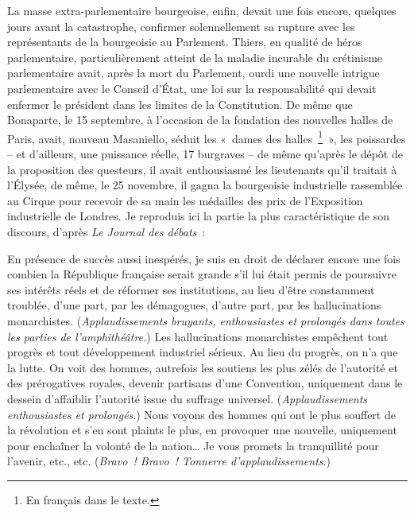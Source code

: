 \documentclass[french,twoside]{book} %
\newenvironment{quoteblock}%
  {\begin{quoting}}
  {\end{quoting}}
\newenvironment{quotebar}{%
    \def\FrameCommand{{\color{rubric!10!}\vrule width 0.5em} \hspace{0.9em}}%
    \def\OuterFrameSep{\itemsep} %
    \MakeFramed {\advance\hsize-\width \FrameRestore}
  }%
  {%
    \endMakeFramed
  }
\renewenvironment{quoteblock}%
  {%
    \savenotes
    \setstretch{0.9}
    \normalfont
    \begin{quotebar}
  }
  {%
    \end{quotebar}
    \spewnotes
  }
\begin{document}
La masse extra-parlementaire bourgeoise, enfin, devait une fois encore, quelques jours avant la catastrophe, confirmer solennellement sa rupture avec les représentants de la bourgeoisie au Parlement. Thiers, en qualité de héros parlementaire, particulièrement atteint de la maladie incurable du crétinisme parlementaire avait, après la mort du Parlement, ourdi une nouvelle intrigue parlementaire avec le Conseil d’État, une loi sur la responsabilité qui devait enfermer le président dans les limites de la Constitution. De même que Bonaparte, le 15 septembre, à l’occasion de la fondation des nouvelles halles de Paris, avait, nouveau Masaniello, séduit les « dames des halles \footnote{En français dans le texte.} », les poissardes – et d’ailleurs, une puissance réelle, 17 burgraves – de même qu’après le dépôt de la proposition des questeurs, il avait enthousiasmé les lieutenants qu’il traitait à l’Élysée, de même, le 25 novembre, il gagna la bourgeoisie industrielle rassemblée au Cirque pour recevoir de sa main les médailles des prix de l’Exposition industrielle de Londres. Je reproduis ici la partie la plus caractéristique de son discours, d’après \emph{Le Journal des débats} :\par

\begin{quoteblock}
 \noindent En présence de succès aussi inespérés, je suis en droit de déclarer encore une fois combien la République française serait grande s’il lui était permis de poursuivre ses intérêts réels et de réformer ses institutions, au lieu d’être constamment troublée, d’une part, par les démagogues, d’autre part, par les hallucinations monarchistes. (\emph{Applaudissements bruyants, enthousiastes et prolongés dans toutes les parties de l’amphithéâtre.}) Les hallucinations monarchistes empêchent tout progrès et tout développement industriel sérieux. Au lieu du progrès, on n’a que la lutte. On voit des hommes, autrefois les soutiens les plus zélés de l’autorité et des prérogatives royales, devenir partisans d’une Convention, uniquement dans le dessein d’affaiblir l’autorité issue du suffrage universel. (\emph{Applaudissements enthousiastes et prolongés}.) Nous voyons des hommes qui ont le plus souffert de la révolution et s’en sont plaints le plus, en provoquer une nouvelle, uniquement pour enchaîner la volonté de la nation… Je vous promets la tranquillité pour l’avenir, etc., etc. (\emph{Bravo ! Bravo ! Tonnerre d’applaudissements}.)
\end{quoteblock}
\end{document}
